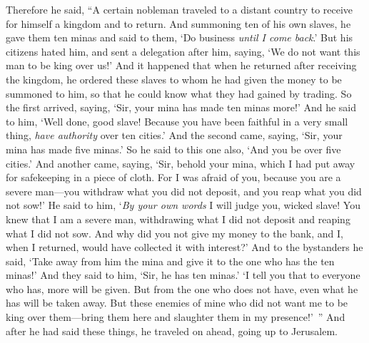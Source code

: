 \begin{biblechapter}
\verse Therefore he said, “A certain nobleman traveled to a distant country to receive for himself a kingdom and to return.
\verse And summoning ten of his own slaves, he gave them ten minas and said to them, ‘Do business \textit{until I come back}.’
\verse But his citizens hated him, and sent a delegation after him, saying, ‘We do not want this man to be king over us!’
\verse And it happened that when he returned after receiving the kingdom, he ordered these slaves to whom he had given the money to be summoned to him, so that he could know what they had gained by trading.
\verse So the first arrived, saying, ‘Sir, your mina has made ten minas more!’
\verse And he said to him, ‘Well done, good slave! Because you have been faithful in a very small thing, \textit{have authority} over ten cities.’
\verse And the second came, saying, ‘Sir, your mina has made five minas.’
\verse So he said to this one also, ‘And you be over five cities.’
\verse And another came, saying, ‘Sir, behold your mina, which I had put away for safekeeping in a piece of cloth.
\verse For I was afraid of you, because you are a severe man—you withdraw what you did not deposit, and you reap what you did not sow!’
\verse He said to him, ‘\textit{By your own words} I will judge you, wicked slave! You knew that I am a severe man, withdrawing what I did not deposit and reaping what I did not sow.
\verse And why did you not give my money to the bank, and I, when I returned, would have collected it with interest?’
\verse And to the bystanders he said, ‘Take away from him the mina and give it to the one who has the ten minas!’
\verse And they said to him, ‘Sir, he has ten minas.’
\verse ‘I tell you that to everyone who has, more will be given. But from the one who does not have, even what he has will be taken away.
\verse But these enemies of mine who did not want me to be king over them—bring them here and slaughter them in my presence!’ ”
 And after he had said these things, he traveled on ahead, going up to Jerusalem.

\end{biblechapter}
